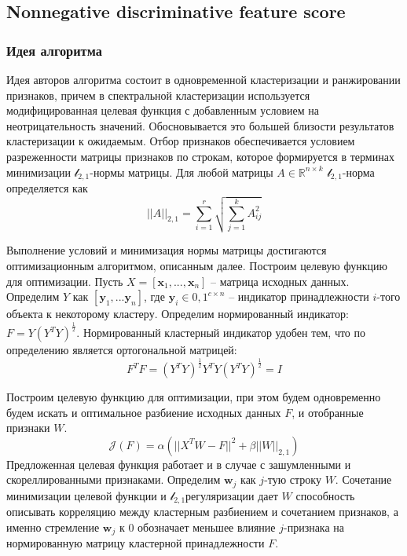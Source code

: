 \subsection{Nonnegative discriminative feature score}
\subsubsection{Идея алгоритма}
Идея авторов алгоритма состоит в одновременной кластеризации и ранжировании признаков, причем в спектральной кластеризации используется модифицированная целевая функция с добавленным условием на неотрицательность значений. Обосновывается это большей близости результатов кластеризации к ожидаемым. Отбор признаков обеспечивается условием разреженности матрицы признаков по строкам, которое формируется в терминах минимизации $\mathcal{l}_{2,1}$-нормы матрицы. Для любой матрицы $A \in \mathbb{R}^{n \times k}$ $\mathcal{l}_{2,1}$-норма определяется как 
\begin{equation}
	||A||_{2,1} = \sum_{i=1}^r \sqrt{\sum_{j=1}^k A_{ij}^2}
\end{equation} 

Выполнение условий и минимизация нормы матрицы достигаются оптимизационным алгоритмом, описанным далее. Построим целевую функцию для оптимизации. Пусть $X = [\mathbf{x}_1,...,\mathbf{x}_n]$ -- матрица исходных данных. Определим $Y$ как $[\mathbf{y}_1,...\mathbf{y}_n]$, где $\mathbf{y}_i \in {0,1}^{c\times n}$ -- индикатор принадлежности $i$-того объекта к некоторому кластеру. Определим нормированный индикатор: $F=Y(Y^T Y)^\frac12$. Нормированный кластерный индикатор удобен тем, что по определению является ортогональной матрицей:
\begin{equation}
	F^T F = (Y^T Y)^\frac12 Y^T Y (Y^T Y)^\frac12 = I
\end{equation}

Построим целевую функцию для оптимизации, при этом будем одновременно будем искать и оптимальное разбиение исходных данных $F$, и отобранные признаки $W$. 
\begin{equation}
	\mathcal{J}(F) = \alpha(||X^T W - F||^2 + \beta||W||_{2,1})
\end{equation}
Предложенная целевая функция работает и в случае с зашумленными и скореллированными признаками. Определим $\mathbf{w}_j$ как $j$-тую строку $W$. Сочетание минимизации целевой функции и $\mathcal{l}_{2,1}$регуляризации дает $W$ способность описывать корреляцию между кластерным разбиением и сочетанием признаков, а именно стремление $\mathbf{w}_j$ к 0 обозначает меньшее влияние $j$-признака на нормированную матрицу кластерной принадлежности $F$.

